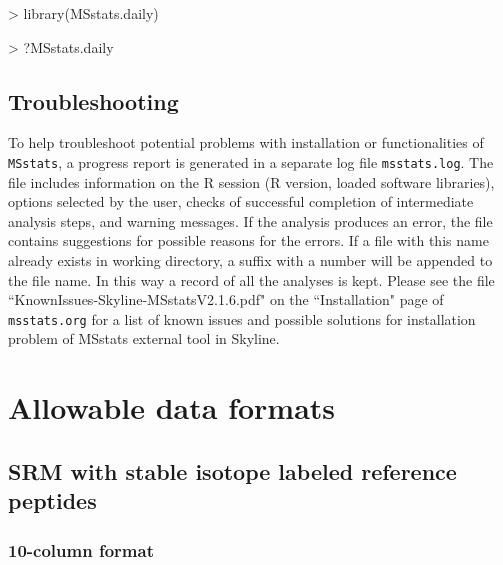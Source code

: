 \documentclass[11pt]{article}
\begin{document}
\begin{small}
\begin{Schunk}
\begin{Sinput}
> library(MSstats.daily)
\end{Sinput}
\end{Schunk}
\end{small}

\begin{small}
\begin{Schunk}
\begin{Sinput}
> ?MSstats.daily
\end{Sinput}
\end{Schunk}
\end{small}

\subsection*{Troubleshooting}

To help troubleshoot potential problems with installation or functionalities of {\tt MSstats}, a progress report is generated in a separate log file {\tt msstats.log}. The file includes information on the R session (R version, loaded software libraries), options selected by the user, checks of successful completion of intermediate analysis steps, and warning messages. If the analysis produces an error, the file contains suggestions for possible reasons for the errors. If a file with this name already exists in working directory, a suffix with a number will be appended to the file name. In this way a record of all the analyses is kept. {\color{red} Please see the file ``KnownIssues-Skyline-MSstatsV2.1.6.pdf" on the ``Installation" page of {\tt msstats.org} for a list of known issues and possible solutions for installation problem of MSstats external tool in Skyline.}

\clearpage
\section{Allowable data formats}

\subsection{SRM with stable isotope labeled reference peptides \label{sec:allowableSRM}} 

\subsubsection{10-column format} 
\end{document}
